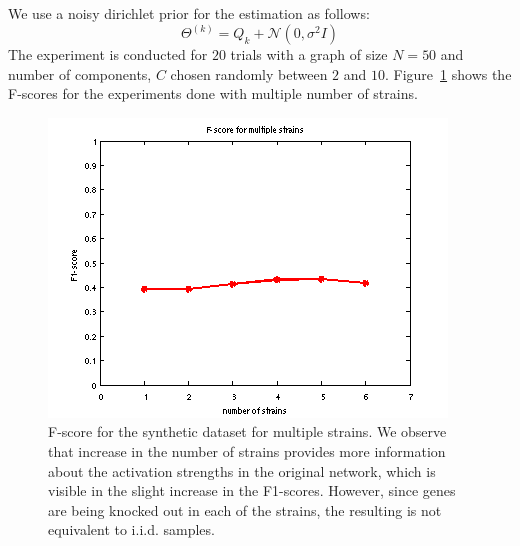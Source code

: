 \documentclass{bioinfo}
\begin{document}
We use a noisy dirichlet prior for the estimation as follows: 
\begin{equation}
  \label{eq:exp1_prior}
\Theta^{(k)}  = Q_{k} + {\mathcal N}(0, \sigma^{2} I)   
\end{equation}
The experiment is conducted for $20$ trials with a graph of size
$N=50$ and number of components, $C$ chosen randomly between $2$ and
$10$. Figure~\ref{fig:exp1_fig} shows the F-scores for the
experiments done with multiple number of strains. 
 \begin{figure}[h]
   \centering
     \includegraphics[scale=0.75]{results/Fig1_2}
   \caption{F-score for the synthetic dataset for multiple strains. We
     observe that increase in the number of strains provides more
     information about the activation strengths in the original
     network, which is visible in the slight increase in the
     F1-scores. However, since genes are being knocked out in each of
     the strains, the resulting is not equivalent to i.i.d. samples.  
   }
   \label{fig:exp1_fig}
 \end{figure}

\end{document}
